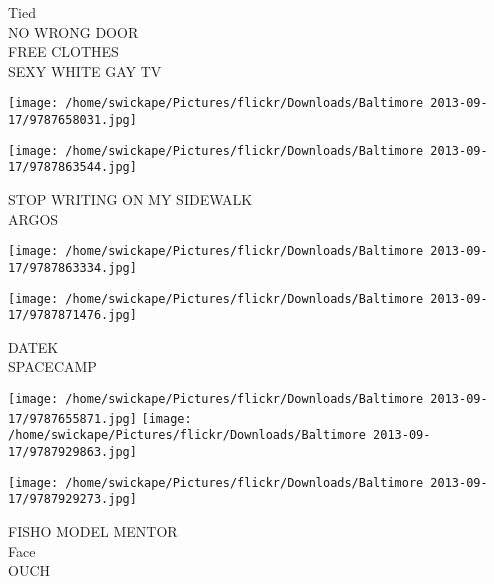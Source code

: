 \documentclass[10pt,letterpaper]{article}
\begin{document}
Tied\\
NO WRONG DOOR\\
FREE CLOTHES\\
SEXY WHITE GAY TV\\
\pagebreak

\texttt{[image: /home/swickape/Pictures/flickr/Downloads/Baltimore 2013-09-17/9787658031.jpg]}

\vspace{0.25in}
\texttt{[image: /home/swickape/Pictures/flickr/Downloads/Baltimore 2013-09-17/9787863544.jpg]}

STOP WRITING ON MY SIDEWALK\\
ARGOS\\
\pagebreak

\texttt{[image: /home/swickape/Pictures/flickr/Downloads/Baltimore 2013-09-17/9787863334.jpg]}

\vspace{0.25in}
\texttt{[image: /home/swickape/Pictures/flickr/Downloads/Baltimore 2013-09-17/9787871476.jpg]}

DATEK\\
SPACECAMP\\
\pagebreak

\texttt{[image: /home/swickape/Pictures/flickr/Downloads/Baltimore 2013-09-17/9787655871.jpg]}
\texttt{[image: /home/swickape/Pictures/flickr/Downloads/Baltimore 2013-09-17/9787929863.jpg]}

\texttt{[image: /home/swickape/Pictures/flickr/Downloads/Baltimore 2013-09-17/9787929273.jpg]}

FISHO MODEL MENTOR\\
Face\\
OUCH\\
\pagebreak
\end{document}
